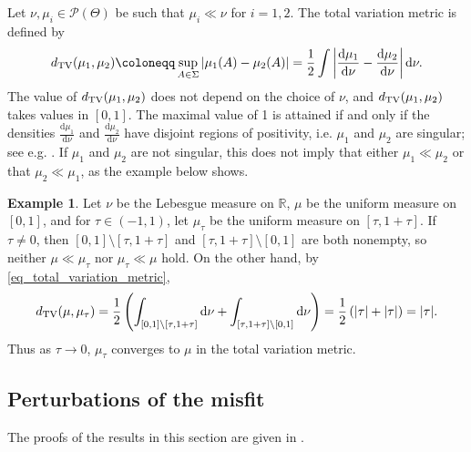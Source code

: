 \documentclass[a4paper]{scrartcl}
\theoremstyle{definition}
\newtheorem{example}[theorem]{Example}
\numberwithin{equation}{section}
\newcommand{\R}{\mathbb{R}}
\newcommand{\rd}{\mathrm{d}}
\newcommand{\abs}[1]{\vert #1\vert}
\newcommand{\Abs}[1]{\left\vert#1\right\vert}
\newcommand{\TV}[0]{\textup{TV}}
\begin{document}
Let $\nu,\mu_i\in\mathcal{P}(\Theta)$ be such that $\mu_i\ll\nu$ for $i=1,2$.
The total variation metric is defined by
\begin{equation}
 d_\TV(\mu_1,\mu_2)\coloneqq \sup_{A\in\Sigma}\abs{\mu_1(A)-\mu_2(A)}=\frac{1}{2}\int\Abs{\frac{\rd \mu_1}{\rd\nu}-\frac{\rd\mu_2}{\rd\nu}}\rd\nu.
 \label{eq_total_variation_metric}
 \end{equation}
 The value of $d_\TV(\mu_1,\mu_2)$ does not depend on the choice of $\nu$, and $d_{\TV}(\mu_1,\mu_2)$ takes values in $[0,1]$.
 The maximal value of 1 is attained if and only if the densities $\tfrac{\rd\mu_1}{\rd\nu}$ and $\tfrac{\rd\mu_2}{\rd\nu}$ have disjoint regions of positivity, i.e. $\mu_1$ and $\mu_2$ are singular; see e.g. \cite[Section B.1]{GhosalvanderVaart2017}. 
 If $\mu_1$ and $\mu_2$ are not singular, this does not imply that either $\mu_1\ll\mu_2$ or that $\mu_2\ll\mu_1$, as the example below shows.
 \begin{example}
  \label{example_translated_uniform_measure}
  Let $\nu$ be the Lebesgue measure on $\R$, $\mu$ be the uniform measure on $[0,1]$, and for $\tau\in (-1,1)$, let $\mu_\tau$ be the uniform measure on $[\tau,1+\tau]$. 
  If $\tau \neq 0$, then $[0,1]\setminus [\tau,1+\tau]$ and $[\tau,1+\tau]\setminus[0,1]$ are both nonempty, so neither $\mu\ll\mu_\tau$ nor $\mu_\tau\ll\mu$ hold.
  On the other hand, by \eqref{eq_total_variation_metric},
  \begin{equation*}
    d_{\TV}(\mu,\mu_\tau)=\frac{1}{2}\left(\int_{[0,1]\setminus[\tau,1+\tau]}\rd \nu+\int_{[\tau,1+\tau]\setminus[0,1]}\rd \nu\right)=\frac{1}{2}\left(\abs{\tau}+\abs{\tau}\right)=\abs{\tau}.
  \end{equation*}
  Thus as $\tau\to 0$, $\mu_\tau$ converges to $\mu$ in the total variation metric.
 \end{example}

\subsection{Perturbations of the misfit}
\label{sectionTVbounds_misfit_perturbation}

The proofs of the results in this section are given in .
\end{document}
